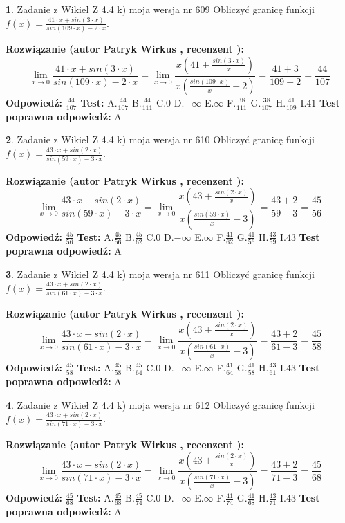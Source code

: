 \documentclass[12pt, a4paper]{article}
\theoremstyle{definition} %
\newtheorem{zad}{}
\newcommand{\zadStart}[1]{\begin{zad}#1\newline}
\newcommand{\zadStop}{\end{zad}}
\newcommand{\rozwStart}[2]{\noindent \textbf{Rozwiązanie (autor #1 , recenzent #2): }\newline}
\newcommand{\rozwStop}{\newline}
\newcommand{\odpStart}{\noindent \textbf{Odpowiedź:}\newline}
\newcommand{\odpStop}{\newline}
\newcommand{\testStart}{\noindent \textbf{Test:}\newline}
\newcommand{\testStop}{\newline}
\newcommand{\kluczStart}{\noindent \textbf{Test poprawna odpowiedź:}\newline}
\newcommand{\kluczStop}{\newline}
\begin{document}
\zadStart{Zadanie z Wikieł Z 4.4 k) moja wersja nr 609}
Obliczyć granicę funkcji $f(x)=\frac{41\cdot x +sin(3\cdot x)}{sin(109\cdot x) -2\cdot x}$.
\zadStop
\rozwStart{Patryk Wirkus}{}
$$\lim\limits_{x\to 0}\frac{41\cdot x +sin(3\cdot x)}{sin(109\cdot x) -2\cdot x}
=\lim\limits_{x\to 0}\frac{x(41+\frac{sin(3\cdot x)}{x})}{x(\frac{sin(109\cdot x)}{x}-2)}
=\frac{41+3}{109-2} = \frac{44}{107}$$
\rozwStop
\odpStart
$\frac{44}{107}$
\odpStop
\testStart
A.$\frac{44}{107}$
B.$\frac{44}{111}$
C.$0$
D.$-\infty$
E.$\infty$
F.$\frac{38}{111}$
G.$\frac{38}{107}$
H.$\frac{41}{109}$
I.$41$
\testStop
\kluczStart
A
\kluczStop



\zadStart{Zadanie z Wikieł Z 4.4 k) moja wersja nr 610}
Obliczyć granicę funkcji $f(x)=\frac{43\cdot x +sin(2\cdot x)}{sin(59\cdot x) -3\cdot x}$.
\zadStop
\rozwStart{Patryk Wirkus}{}
$$\lim\limits_{x\to 0}\frac{43\cdot x +sin(2\cdot x)}{sin(59\cdot x) -3\cdot x}
=\lim\limits_{x\to 0}\frac{x(43+\frac{sin(2\cdot x)}{x})}{x(\frac{sin(59\cdot x)}{x}-3)}
=\frac{43+2}{59-3} = \frac{45}{56}$$
\rozwStop
\odpStart
$\frac{45}{56}$
\odpStop
\testStart
A.$\frac{45}{56}$
B.$\frac{45}{62}$
C.$0$
D.$-\infty$
E.$\infty$
F.$\frac{41}{62}$
G.$\frac{41}{56}$
H.$\frac{43}{59}$
I.$43$
\testStop
\kluczStart
A
\kluczStop



\zadStart{Zadanie z Wikieł Z 4.4 k) moja wersja nr 611}
Obliczyć granicę funkcji $f(x)=\frac{43\cdot x +sin(2\cdot x)}{sin(61\cdot x) -3\cdot x}$.
\zadStop
\rozwStart{Patryk Wirkus}{}
$$\lim\limits_{x\to 0}\frac{43\cdot x +sin(2\cdot x)}{sin(61\cdot x) -3\cdot x}
=\lim\limits_{x\to 0}\frac{x(43+\frac{sin(2\cdot x)}{x})}{x(\frac{sin(61\cdot x)}{x}-3)}
=\frac{43+2}{61-3} = \frac{45}{58}$$
\rozwStop
\odpStart
$\frac{45}{58}$
\odpStop
\testStart
A.$\frac{45}{58}$
B.$\frac{45}{64}$
C.$0$
D.$-\infty$
E.$\infty$
F.$\frac{41}{64}$
G.$\frac{41}{58}$
H.$\frac{43}{61}$
I.$43$
\testStop
\kluczStart
A
\kluczStop



\zadStart{Zadanie z Wikieł Z 4.4 k) moja wersja nr 612}
Obliczyć granicę funkcji $f(x)=\frac{43\cdot x +sin(2\cdot x)}{sin(71\cdot x) -3\cdot x}$.
\zadStop
\rozwStart{Patryk Wirkus}{}
$$\lim\limits_{x\to 0}\frac{43\cdot x +sin(2\cdot x)}{sin(71\cdot x) -3\cdot x}
=\lim\limits_{x\to 0}\frac{x(43+\frac{sin(2\cdot x)}{x})}{x(\frac{sin(71\cdot x)}{x}-3)}
=\frac{43+2}{71-3} = \frac{45}{68}$$
\rozwStop
\odpStart
$\frac{45}{68}$
\odpStop
\testStart
A.$\frac{45}{68}$
B.$\frac{45}{74}$
C.$0$
D.$-\infty$
E.$\infty$
F.$\frac{41}{74}$
G.$\frac{41}{68}$
H.$\frac{43}{71}$
I.$43$
\testStop
\kluczStart
A
\kluczStop
\end{document}
